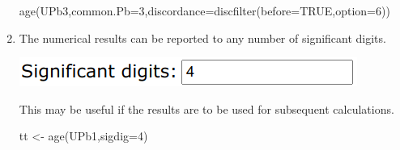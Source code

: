 \begin{refsection}
\begin{enumerate}
\begin{console}
age(UPb3,common.Pb=3,discordance=discfilter(before=TRUE,option=6))
\end{console}

\item The numerical results can be reported to any number of
  significant digits.

\noindent\begin{minipage}[t]{.4\linewidth}
\strut\vspace*{-\baselineskip}\newline
\includegraphics[width=\linewidth]{../figures/UPbAgesSigdig.png}
\end{minipage}
\begin{minipage}[t]{.6\linewidth}
  This may be useful if the results are to be used for subsequent
  calculations.
\end{minipage}

\begin{console}
tt <- age(UPb1,sigdig=4)
\end{console}

\end{enumerate}

\printbibliography[heading=subbibliography]

\end{refsection}
